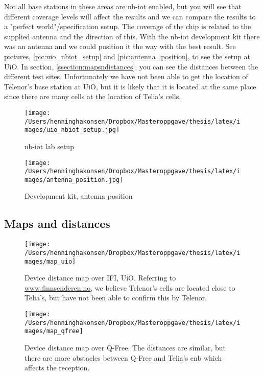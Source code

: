 \documentclass[USenglish]{ifimaster}  %
\begin{document}
Not all base stations in these areas are \acrshort{nb-iot} enabled, but you will see that different coverage levels will affect the results and we can compare the results to a "perfect world"/specification setup. The coverage of the chip is related to the supplied antenna and the direction of this. With the \acrshort{nb-iot} development kit there was an antenna and we could position it the way with the best result. See pictures, \vref{pic:uio_nbiot_setup} and \vref{pic:antenna_position}, to see the setup at UiO. In section, \vref{ssection:mapsndistances}, you can see the distances between the different test sites. Unfortunately we have not been able to get the location of Telenor's base station at UiO, but it is likely that it is located at the same place since there are many cells at the location of Telia's cells.

\begin{figure}[H]
  \centering\texttt{[image: /Users/henninghakonsen/Dropbox/Masteroppgave/thesis/latex/images/uio\_nbiot\_setup.jpg]}
  \caption{\acrshort{nb-iot} lab setup}
  \label{pic:uio_nbiot_setup}
\end{figure}

\begin{figure}[H]
  \centering\texttt{[image: /Users/henninghakonsen/Dropbox/Masteroppgave/thesis/latex/images/antenna\_position.jpg]}
  \caption{Development kit, antenna position}
  \label{pic:antenna_position}
\end{figure}

\subsection{Maps and distances} \label{ssection:mapsndistances}
\begin{figure}[H]
  \centering\texttt{[image: /Users/henninghakonsen/Dropbox/Masteroppgave/thesis/latex/images/map\_uio]}
  \caption[Distance map - IFI, UiO]{Device distance map over IFI, UiO. Referring to \url{www.finnsenderen.no}\cite{online:finnsenderen}, we believe Telenor's cells are located close to Telia's, but have not been able to confirm this by Telenor.}
  \label{figure:map_uio}
\end{figure}

\begin{figure}[H]
  \centering\texttt{[image: /Users/henninghakonsen/Dropbox/Masteroppgave/thesis/latex/images/map\_qfree]}
  \caption[Distance map - Q-Free]{Device distance map over Q-Free. The distances are similar, but there are more obstacles between Q-Free and Telia's \acrshort{enb} which affects the reception.}
  \label{figure:map_qfree}
\end{figure}
\end{document}
